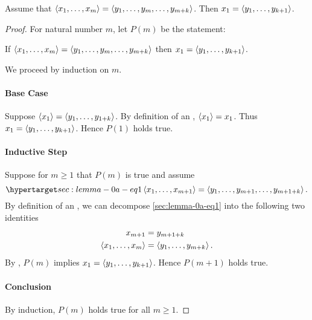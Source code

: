 \documentclass{report}
\begin{document}
\section{}%

  \begin{lemma}[0A]
    Assume that $\left< x_1, \ldots, x_m \right> = \left< y_1, \ldots, y_m, \ldots, y_{m+k} \right>$.
    Then $x_1 = \left< y_1, \ldots, y_{k+1} \right>$.
  \end{lemma}

  \begin{proof}

    For natural number $m$, let $P(m)$ be the statement:
      \begin{induction}
        If $\left< x_1, \ldots, x_m \right> = \left< y_1, \ldots, y_m, \ldots, y_{m+k} \right>$
          then $x_1 = \left< y_1, \ldots, y_{k+1} \right>$.
      \end{induction}
    \noindent
    We proceed by induction on $m$.

    \paragraph{Base Case}%

      Suppose $\left< x_1 \right> = \left< y_1, \ldots, y_{1 + k} \right>$.
      By definition of an , $\left< x_1 \right> = x_1$.
      Thus $x_1 = \left< y_1, \ldots, y_{k + 1} \right>$.
      Hence $P(1)$ holds true.

    \paragraph{Inductive Step}%

      Suppose for $m \geq 1$ that $P(m)$ is true and assume
        \begin{equation}
          \hyperlabel{sec:lemma-0a-eq1}
          \ltuple{x_1}{x_{m+1}} = \ltuple{y_1, \ldots, y_{m+1}}{y_{m+1+k}}.
        \end{equation}
      By definition of an , we can decompose
        \eqref{sec:lemma-0a-eq1} into the following two identities
        \begin{align*}
          x_{m+1} & = y_{m+1+k} \\
          \left< x_1, \ldots, x_m \right> & = \left< y_1, \ldots, y_{m+k} \right>.
        \end{align*}
      By , $P(m)$ implies $x_1 = \left< y_1, \ldots, y_{k+1} \right>$.
      Hence $P(m+1)$ holds true.

    \paragraph{Conclusion}%

      By induction, $P(m)$ holds true for all $m \geq 1$.

  \end{proof}
\end{document}
